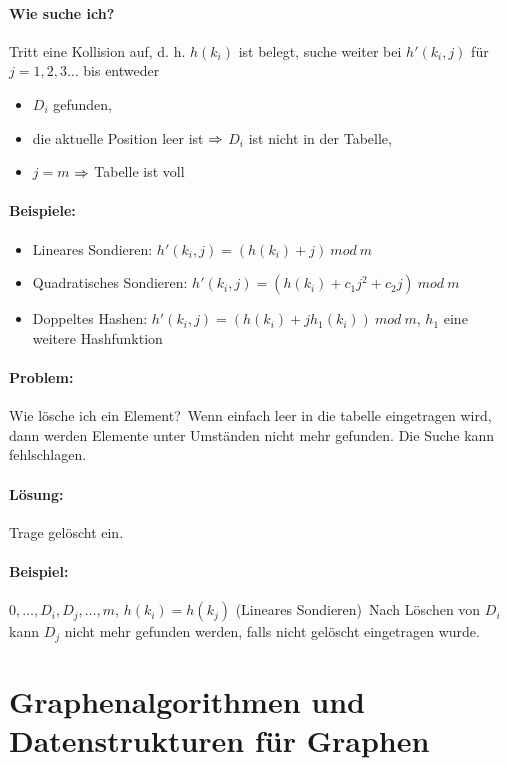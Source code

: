 \documentclass[a4paper,twoside,DIV15,BCOR12mm]{scrbook}
\begin{document}
	\paragraph{Wie suche ich? } Tritt eine Kollision auf, d. h. $h(k_i)$ ist belegt, suche weiter bei $h'(k_i,j)$ für $j=1,2,3\ldots$ bis entweder
	\begin{itemize}
		\item $D_i$ gefunden,
		\item die aktuelle Position leer ist $\Rightarrow$ $D_i$ ist nicht in der Tabelle,
		\item $j=m$ $\Rightarrow$ Tabelle ist voll
	\end{itemize}
	\paragraph{Beispiele: }
	\begin{itemize}
		\item	Lineares Sondieren: $h'(k_i,j) = (h(k_i)+j)\ mod\ m$
		\item Quadratisches Sondieren: $h'(k_i,j) = (h(k_i)+c_1j^2 +c_2j)\ mod\ m$
		\item Doppeltes Hashen: $h'(k_i,j) = (h(k_i)+jh_1(k_i))\ mod\ m$, $h_1$ eine weitere Hashfunktion
	\end{itemize}
	\paragraph{Problem: } Wie lösche ich ein Element?\
	Wenn einfach \glqq leer\grqq{} in die tabelle eingetragen wird, dann werden Elemente unter Umständen nicht mehr gefunden. Die Suche kann fehlschlagen.
	\paragraph{Lösung: } Trage \glqq gelöscht\grqq{} ein.
	\paragraph{Beispiel: } $0,\ldots ,D_i,D_j,\ldots ,m$, $h(k_i)=h(k_j)$ (Lineares Sondieren)\
	Nach Löschen von $D_i$ kann $D_j$ nicht mehr gefunden werden, falls nicht \glqq gelöscht\grqq{}  eingetragen wurde.
	
\section{Graphenalgorithmen und Datenstrukturen für Graphen}
\end{document}

